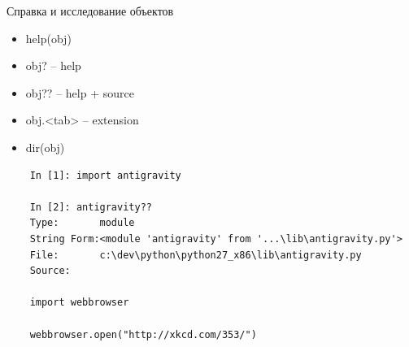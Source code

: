 \documentclass{article}
\begin{document}
\newpage

\begin{center} Справка и исследование объектов \end{center}
\begin{itemize}
    \item help(obj)
    \item obj?    -- help
    \item obj??   -- help + source
    \item obj.<tab>  -- extension
    \item dir(obj)
\end{itemize}

\begin{lstlisting}
    In [1]: import antigravity

    In [2]: antigravity??
    Type:       module
    String Form:<module 'antigravity' from '...\lib\antigravity.py'>
    File:       c:\dev\python\python27_x86\lib\antigravity.py
    Source:

    import webbrowser

    webbrowser.open("http://xkcd.com/353/")
\end{lstlisting}
\newpage

\end{document}
